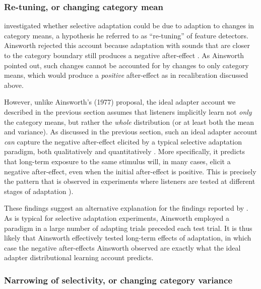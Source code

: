 \subsubsection{Re-tuning, or changing category mean}
\label{sec:re-tuning-or}

\textcite{Ainsworth1977} investigated whether selective adaptation could be due to adaption to changes in category means, a hypothesis he referred to as ``re-tuning'' of feature detectors.  Ainsworth rejected this account because adaptation with sounds that are closer to the category boundary still produces a negative after-effect \cite{Ainsworth1977}.  As Ainsworth pointed out, such changes cannot be accounted for by changes to only category means, which would produce a \emph{positive} after-effect as in recalibration discussed above.  

\label{r2-whole-distribution-2}
However, unlike Ainsworth's (1977) proposal, the ideal adapter account we described in the previous section assumes that listeners implicitly learn not \emph{only} the category means, but rather the {\em whole} distribution (or at least both the mean and variance). As discussed in the previous section, such an ideal adapter account {\em can} capture the negative after-effect elicited by a typical selective adaptation paradigm, both qualitatively and quantitatively \cite{Kleinschmidt2015}. More specifically, it predicts that long-term exposure to the same stimulus will, in many cases, elicit a negative after-effect, even when the initial after-effect is positive.  This is precisely the pattern that is observed in experiments where listeners are tested at different stages of adaptation \autocites{Kleinschmidt2015}[see also][]{Vroomen2007}[and the re-analysis of][therein]{Samuel2001}).

These findings suggest an alternative explanation for the findings reported by \textcite{Ainsworth1977}. As is typical for selective adaptation experiments, Ainsworth employed a paradigm in a large number of adapting trials preceded each test trial. It is thus likely that Ainsworth effectively tested long-term effects of adaptation, in which case the negative after-effects Ainsworth observed are exactly what the ideal adapter distributional learning account predicts.

\subsubsection{Narrowing of selectivity, or changing category variance}
\label{sec:narr-select-or}

